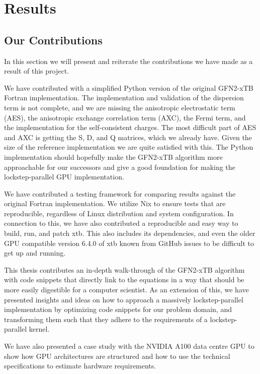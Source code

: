 \chapter{Results}\label{sec:results}

\section{Our Contributions}

In this section we will present and reiterate the contributions we have made as a result of this project.

We have contributed with a simplified Python version of the original GFN2-xTB Fortran implementation. The implementation and validation of the dispersion term is not complete, and we are missing the anisotropic electrostatic term (AES), the anisotropic exchange correlation term (AXC), the Fermi term, and the implementation for the self-consistent charges. The most difficult part of AES and AXC is getting the S, D, and Q matrices, which we already have. Given the size of the reference implementation we are quite satisfied with this. The Python implementation should hopefully make the GFN2-xTB algorithm more approachable for our successors and give a good foundation for making the lockstep-parallel GPU implementation.

We have contributed a testing framework for comparing results against the original Fortran implementation. We utilize Nix to ensure tests that are reproducible, regardless of Linux distribution and system configuration. In connection to this, we have also contributed a reproducible and easy way to build, run, and patch xtb. This also includes its dependencies, and even the older GPU compatible version 6.4.0 of xtb known from GitHub issues to be difficult to get up and running.

This thesis contributes an in-depth walk-through of the GFN2-xTB algorithm with code snippets that directly link to the equations in a way that should be more easily digestible for a computer scientist. As an extension of this, we have presented insights and ideas on how to approach a massively lockstep-parallel implementation by optimizing code snippets for our problem domain, and transforming them such that they adhere to the requirements of a lockstep-parallel kernel.

We have also presented a case study with the NVIDIA A100 data centre GPU to show how GPU architectures are structured and how to use the technical specifications to estimate hardware requirements.

